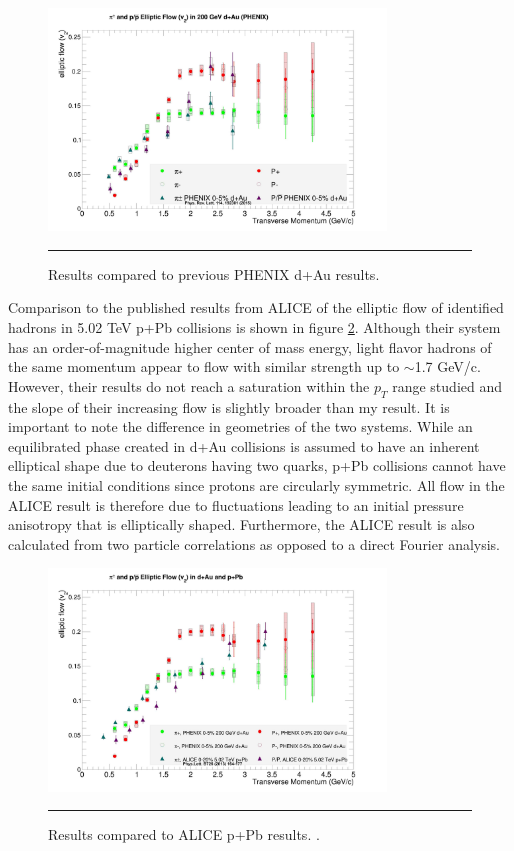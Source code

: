 \begin{figure}[hbtp]
\centering    
    \includegraphics[width=0.8\textwidth]{results/v2allvsshengli.jpg}
    \rule{35em}{0.5pt}
    \caption[Results compared to previous PHENIX d+Au results.]{Results compared to previous PHENIX d+Au results\citep{Adare:2014keg}.}
    \label{fig:v2allvsshengli}
\end{figure}
Comparison to the published results from ALICE of the elliptic flow of identified hadrons in 5.02 TeV p+Pb collisions is shown in figure \ref{fig:v2allvsalice}. Although their system has an order-of-magnitude higher center of mass energy, light flavor hadrons of the same momentum appear to flow with similar strength up to $\sim$1.7 GeV/c. However, their results do not reach a saturation within the $p_T$ range studied and the slope of their increasing flow is slightly broader than my result. It is important to note the difference in geometries of the two systems. While an equilibrated phase created in d+Au collisions is assumed to have an inherent elliptical shape due to deuterons having two quarks, p+Pb collisions cannot have the same initial conditions since protons are circularly symmetric. All flow in the ALICE result is therefore due to fluctuations leading to an initial pressure anisotropy that is elliptically shaped. Furthermore, the ALICE result is also calculated from two particle correlations as opposed to a direct Fourier analysis. 

\begin{figure}[hbtp]
\centering    
    \includegraphics[width=0.8\textwidth]{results/v2allvsalice.jpg}
    \rule{35em}{0.5pt}
    \caption[Results compared to ALICE p+Pb results.]{Results compared to ALICE p+Pb results. \citep{ABELEV:2013wsa}.}
    \label{fig:v2allvsalice}
\end{figure}

